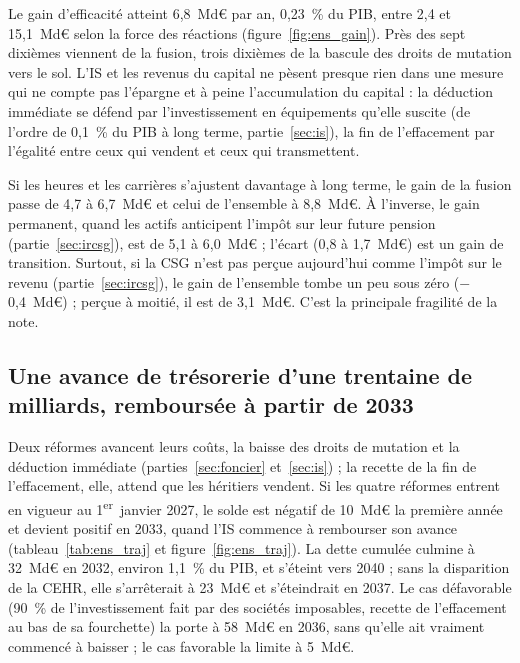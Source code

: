 Le gain d'efficacité atteint 6,8~Md€ par an, 0,23~\% du PIB, entre 2,4 et 15,1~Md€ selon la force des réactions
(figure~\ref{fig:ens_gain}). Près des sept dixièmes viennent de la fusion, trois dixièmes de la bascule des droits de
mutation vers le sol. L'IS et les revenus du capital ne pèsent presque rien dans une mesure qui ne compte pas
l'épargne et à peine l'accumulation du capital : la déduction immédiate se défend par l'investissement en équipements
qu'elle suscite (de l'ordre de 0,1~\% du PIB à long terme, partie~\ref{sec:is}), la fin de l'effacement par l'égalité
entre ceux qui vendent et ceux qui transmettent.


Si les heures et les carrières s'ajustent davantage à long terme, le gain de la fusion passe de 4,7 à 6,7~Md€ et celui
de l'ensemble à 8,8~Md€. À l'inverse, le gain permanent, quand les actifs anticipent l'impôt sur leur future pension
(partie~\ref{sec:ircsg}), est de 5,1 à 6,0~Md€ ; l'écart (0,8 à 1,7~Md€) est un gain de transition. Surtout, si la CSG
n'est pas perçue aujourd'hui comme l'impôt sur le revenu (partie~\ref{sec:ircsg}), le gain de l'ensemble tombe un peu sous
zéro ($-$0,4~Md€) ; perçue à moitié, il est de 3,1~Md€. C'est la principale fragilité de la note.

\subsection{Une avance de trésorerie d'une trentaine de milliards, remboursée à partir de 2033}\label{sec:ens_trajectoire}

Deux réformes avancent leurs coûts, la baisse des droits de mutation et la déduction immédiate
(parties~\ref{sec:foncier} et~\ref{sec:is}) ; la recette de la fin de l'effacement, elle, attend que les héritiers
vendent. Si les quatre réformes entrent en vigueur au 1\textsuperscript{er}~janvier 2027, le solde est négatif de 10~Md€
la première année et devient positif en 2033, quand l'IS commence à rembourser son avance (tableau~\ref{tab:ens_traj} et
figure~\ref{fig:ens_traj}). La dette cumulée culmine à 32~Md€ en 2032, environ 1,1~\% du PIB, et s'éteint vers 2040 ;
sans la disparition de la CEHR, elle s'arrêterait à 23~Md€ et s'éteindrait en 2037. Le cas défavorable (90~\% de
l'investissement fait par des sociétés imposables, recette de l'effacement au bas de sa fourchette) la porte à 58~Md€ en
2036, sans qu'elle ait vraiment commencé à baisser ; le cas favorable la limite à 5~Md€.


